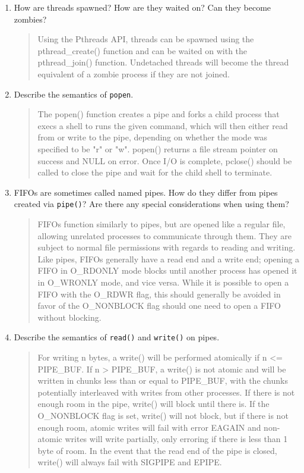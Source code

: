 \documentclass[letterpaper,10pt,onecolumn,titlepage]{article}
\begin{document}
\begin{enumerate}
\item How are threads spawned? How are they waited on? Can they become zombies?
\begin{quote}
Using the Pthreads API, threads can be spawned using the pthread\_create() function and can be waited on with the pthread\_join() function.  Undetached threads will become the thread equivalent of a zombie process if they are not joined.
\end{quote}

\item Describe the semantics of \texttt{popen}.
\begin{quote}
The popen() function creates a pipe and forks a child process that execs a shell to runs the given command, which will then either read from or write to the pipe, depending on whether the mode was specified to be "r" or "w".  popen() returns a file stream pointer on success and NULL on error.  Once I/O is complete, pclose() should be called to close the pipe and wait for the child shell to terminate.
\end{quote}

\item FIFOs are sometimes called named pipes. How do they differ from pipes created via \texttt{pipe()}? Are there any special considerations when using them?
\begin{quote}
FIFOs function similarly to pipes, but are opened like a regular file, allowing unrelated processes to communicate through them.  They are subject to normal file permissions with regards to reading and writing.  Like pipes, FIFOs generally have a read end and a write end; opening a FIFO in O\_RDONLY mode blocks until another process has opened it in O\_WRONLY mode, and vice versa.  While it is possible to open a FIFO with the O\_RDWR flag, this should generally be avoided in favor of the O\_NONBLOCK flag should one need to open a FIFO without blocking.
\end{quote}

\item \label{last} Describe the semantics of \texttt{read()} and \texttt{write()} on pipes.
\begin{quote}
For writing n bytes, a write() will be performed atomically if n <= PIPE\_BUF.  If n > PIPE\_BUF, a write() is not atomic and will be written in chunks less than or equal to PIPE\_BUF, with the chunks potentially interleaved with writes from other processes.  If there is not enough room in the pipe, write() will block until there is.  If the O\_NONBLOCK flag is set, write() will not block, but if there is not enough room, atomic writes will fail with error EAGAIN and non-atomic writes will write partially, only erroring if there is less than 1 byte of room.  In the event that the read end of the pipe is closed, write() will always fail with SIGPIPE and EPIPE.


\end{quote}
\end{enumerate}
\end{document}
